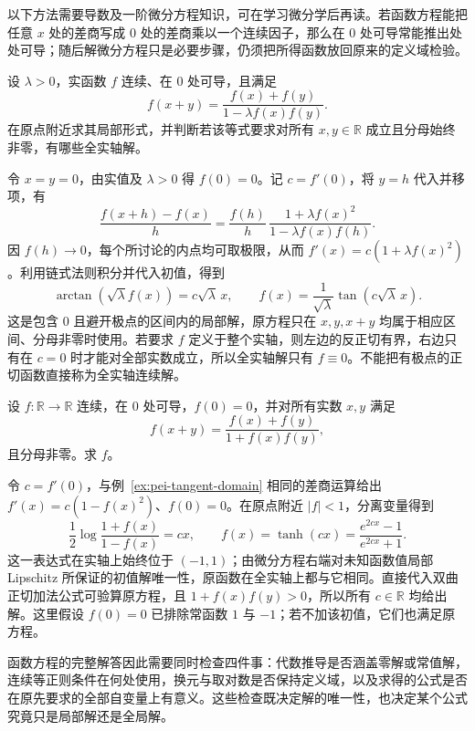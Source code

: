 以下方法需要导数及一阶微分方程知识，可在学习微分学后再读。若函数方程能把任意 $x$ 处的差商写成 $0$ 处的差商乘以一个连续因子，那么在 $0$ 处可导常能推出处处可导；随后解微分方程只是必要步骤，仍须把所得函数放回原来的定义域检验。

\begin{example}
\label{ex:pei-tangent-domain}
设 $\lambda>0$，实函数 $f$ 连续、在 $0$ 处可导，且满足
\begin{equation}
\label{eq:pei-tangent-equation}
f(x+y)=\frac{f(x)+f(y)}{1-\lambda f(x)f(y)}.
\end{equation}
在原点附近求其局部形式，并判断若该等式要求对所有 $x,y\in\mathbb R$ 成立且分母始终非零，有哪些全实轴解。
\end{example}

\begin{solve}
令 $x=y=0$，由实值及 $\lambda>0$ 得 $f(0)=0$。记 $c=f'(0)$，将 $y=h$ 代入并移项，有
\[
\frac{f(x+h)-f(x)}h=
\frac{f(h)}h\,\frac{1+\lambda f(x)^2}{1-\lambda f(x)f(h)}.
\]
因 $f(h)\to0$，每个所讨论的内点均可取极限，从而 $f'(x)=c(1+\lambda f(x)^2)$。利用链式法则积分并代入初值，得到
\[
\arctan(\sqrt\lambda f(x))=c\sqrt\lambda\,x,
\qquad
f(x)=\frac1{\sqrt\lambda}\tan(c\sqrt\lambda\,x).
\]
这是包含 $0$ 且避开极点的区间内的局部解，原方程只在 $x,y,x+y$ 均属于相应区间、分母非零时使用。若要求 $f$ 定义于整个实轴，则左边的反正切有界，右边只有在 $c=0$ 时才能对全部实数成立，所以全实轴解只有 $f\equiv0$。不能把有极点的正切函数直接称为全实轴连续解。
\end{solve}

\begin{example}
设 $f:\mathbb R\to\mathbb R$ 连续，在 $0$ 处可导，$f(0)=0$，并对所有实数 $x,y$ 满足
\[
f(x+y)=\frac{f(x)+f(y)}{1+f(x)f(y)},
\]
且分母非零。求 $f$。
\end{example}

\begin{solve}
令 $c=f'(0)$，与例~\ref{ex:pei-tangent-domain} 相同的差商运算给出 $f'(x)=c(1-f(x)^2)$、$f(0)=0$。在原点附近 $|f|<1$，分离变量得到
\[
\frac12\log\frac{1+f(x)}{1-f(x)}=cx,
\qquad f(x)=\tanh(cx)=\frac{e^{2cx}-1}{e^{2cx}+1}.
\]
这一表达式在实轴上始终位于 $(-1,1)$；由微分方程右端对未知函数值局部 Lipschitz 所保证的初值解唯一性，原函数在全实轴上都与它相同。直接代入双曲正切加法公式可验算原方程，且 $1+f(x)f(y)>0$，所以所有 $c\in\mathbb R$ 均给出解。这里假设 $f(0)=0$ 已排除常函数 $1$ 与 $-1$；若不加该初值，它们也满足原方程。
\end{solve}

函数方程的完整解答因此需要同时检查四件事：代数推导是否涵盖零解或常值解，连续等正则条件在何处使用，换元与取对数是否保持定义域，以及求得的公式是否在原先要求的全部自变量上有意义。这些检查既决定解的唯一性，也决定某个公式究竟只是局部解还是全局解。





